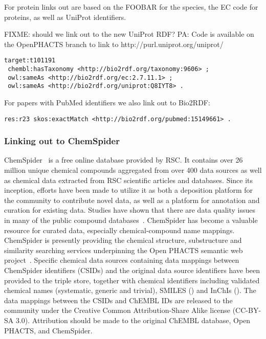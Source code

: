 \documentclass[sw]{iosart2c}
\begin{document}
For protein links out are based on the FOOBAR for the species, the EC code for proteins,
as well as UniProt identifiers.

FIXME: should we link out to the new UniProt RDF? PA: Code is available on the OpenPHACTS branch to link to http://purl.uniprot.org/uniprot/

\begin{tiny}
\begin{verbatim}
target:t101191
 chembl:hasTaxonomy <http://bio2rdf.org/taxonomy:9606> ;
 owl:sameAs <http://bio2rdf.org/ec:2.7.11.1> ;
 owl:sameAs <http://bio2rdf.org/uniprot:Q8IYT8> .
\end{verbatim}
\end{tiny}

For papers with PubMed identifiers we also link out to Bio2RDF:

\begin{tiny}
\begin{verbatim}
res:r23 skos:exactMatch <http://bio2rdf.org/pubmed:15149661> .
\end{verbatim}
\end{tiny}

\subsubsection{Linking out to ChemSpider}

ChemSpider~\cite{Pence2010} is a free online database provided by RSC. It contains over 26 million unique
chemical compounds aggregated from over 400 data sources as well as chemical data extracted
from RSC scientific articles and databases. Since its inception, efforts have been made to
utilize it as both a deposition platform for the community to contribute novel data, as
well as a platform for annotation and curation for existing data. Studies have shown that there are data
quality issues in many of the public compound databases~\cite{Williams2011}. ChemSpider has become a
valuable resource for curated data, especially chemical-compound name mappings. ChemSpider
is presently providing the chemical structure, substructure and similarity searching services 
underpinning the Open PHACTS semantic web project~\cite{Williams2012}. Specific chemical data 
sources containing data mappings between ChemSpider identifiers (CSIDs) and the original data 
source identifiers have been provided to the triple store, together with chemical identifiers 
including validated chemical names (systematic, generic and trivial), SMILES () and InChIs (). 
The data mappings between the CSIDs and ChEMBL IDs are released to the 
community under the Creative Common Attribution-Share Alike license (CC-BY-SA 3.0). Attribution 
should be made to the original ChEMBL database, Open PHACTS, and ChemSpider.
\end{document}
